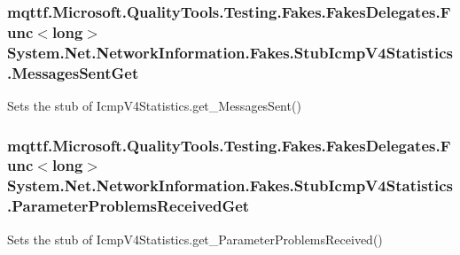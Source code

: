 \hypertarget{class_system_1_1_net_1_1_network_information_1_1_fakes_1_1_stub_icmp_v4_statistics_a604fd75feec4357c52a7714ec51a53bd}{
\subsubsection[{Messages\-Sent\-Get}]{\setlength{\rightskip}{0pt plus 5cm}mqttf.\-Microsoft.\-Quality\-Tools.\-Testing.\-Fakes.\-Fakes\-Delegates.\-Func$<$long$>$ System.\-Net.\-Network\-Information.\-Fakes.\-Stub\-Icmp\-V4\-Statistics.\-Messages\-Sent\-Get}}\label{class_system_1_1_net_1_1_network_information_1_1_fakes_1_1_stub_icmp_v4_statistics_a604fd75feec4357c52a7714ec51a53bd}


Sets the stub of Icmp\-V4\-Statistics.\-get\-\_\-\-Messages\-Sent()

\hypertarget{class_system_1_1_net_1_1_network_information_1_1_fakes_1_1_stub_icmp_v4_statistics_a0cdce7c10e509dd3b661943ec2b86a1b}{
\subsubsection[{Parameter\-Problems\-Received\-Get}]{\setlength{\rightskip}{0pt plus 5cm}mqttf.\-Microsoft.\-Quality\-Tools.\-Testing.\-Fakes.\-Fakes\-Delegates.\-Func$<$long$>$ System.\-Net.\-Network\-Information.\-Fakes.\-Stub\-Icmp\-V4\-Statistics.\-Parameter\-Problems\-Received\-Get}}\label{class_system_1_1_net_1_1_network_information_1_1_fakes_1_1_stub_icmp_v4_statistics_a0cdce7c10e509dd3b661943ec2b86a1b}


Sets the stub of Icmp\-V4\-Statistics.\-get\-\_\-\-Parameter\-Problems\-Received()

